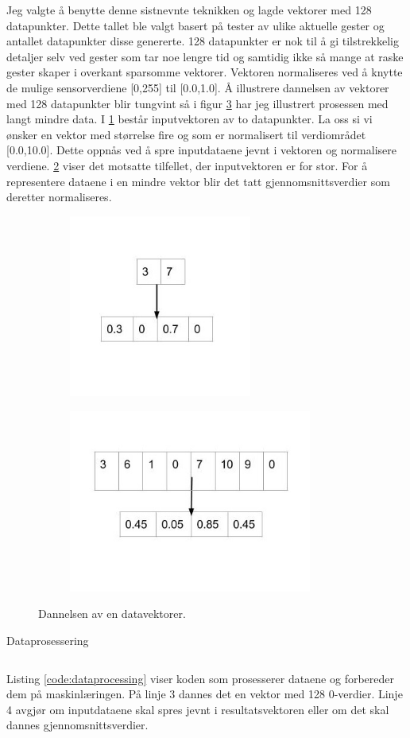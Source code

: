 Jeg valgte å benytte denne sistnevnte teknikken og lagde vektorer med 128 datapunkter. Dette tallet ble valgt basert på tester av ulike aktuelle gester og antallet datapunkter disse genererte. 128 datapunkter er nok til å gi tilstrekkelig detaljer selv ved gester som tar noe lengre tid og samtidig ikke så mange at raske gester skaper i overkant sparsomme vektorer. Vektoren normaliseres ved å knytte de mulige sensorverdiene [0,255] til [0.0,1.0]. Å illustrere dannelsen av vektorer med 128 datapunkter blir tungvint så i figur \ref{fig:data} har jeg illustrert prosessen med langt mindre data. I \ref{fig:few} består inputvektoren av to datapunkter. La oss si vi ønsker en vektor med størrelse fire og som er normalisert til verdiområdet [0.0,10.0]. Dette oppnås ved å spre inputdataene jevnt i vektoren og normalisere verdiene. \ref{fig:many} viser det motsatte tilfellet, der inputvektoren er for stor. For å representere dataene i en mindre vektor blir det tatt gjennomsnittsverdier som deretter normaliseres.
\begin{figure}[h]
\centering
\begin{subfigure}{0.44\textwidth}
\includegraphics[width=6cm, height=6cm]{fig/process1}
\caption{}
\label{fig:few}
\end{subfigure}
\begin{subfigure}{0.44\textwidth}
\includegraphics[width=8cm, height=6cm]{fig/process2}
\caption{}
\label{fig:many}
\end{subfigure}
\caption{Dannelsen av en datavektorer.}
\label{fig:data}
\end{figure}
\begin{listing}[ht]
\caption{Dataprosessering}
\inputminted[fontsize=\footnotesize, linenos]{python}{kodesnutter/preprocess_data.py}
\label{code:dataprocessing}
\end{listing}
Listing \ref{code:dataprocessing} viser koden som prosesserer dataene og forbereder dem på maskinlæringen. På linje 3 dannes det en vektor med 128 0-verdier. Linje 4 avgjør om inputdataene skal spres jevnt i resultatsvektoren eller om det skal dannes gjennomsnittsverdier.

